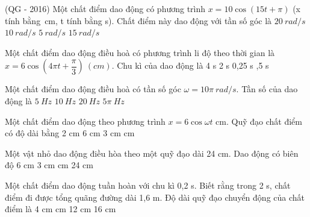 \setcounter{ex}{0}
\setcounter{paragraph}{0}
\PhanI

\begin{ex} %
(QG - 2016) Một chất điểm dao động có phương trình $x=10\cos\left(15t+\pi\right)$ (x tính bằng\ cm, t tính bằng s). Chất điểm này dao động với tần số góc là
\choice
{$20\ rad/s$}
{$10\ rad/s$}
{$5\ rad/s$}
{\True $15\ rad/s$}
\end{ex} 
\begin{ex}
Một chất điểm dao động điều hoà có phương trình li độ theo thời gian là $x=6\cos(4\pi t+\dfrac{\pi}{3})\ (cm)$. Chu kì của dao động là
\choice
{4 s}
{2 s}
{0,25 s}
{,5 s}
\end{ex} 
\begin{ex}
Một chất điểm dao động điều hoà có tần số góc $\omega=10\pi\ rad/s$. Tần số của dao động là
\choice
{\True $5\ Hz$}
{$10\ Hz$}
{$20\ Hz$}
{$5\pi\ Hz$}
\end{ex} 
\begin{ex}%
Một chất điểm dao động theo phương trình $x = 6\cos\omega t$ cm. Quỹ đạo chất điểm có độ dài bằng
\choice
{2 cm}
{6 cm}
{3 cm}
{ cm}
\end{ex} 

\begin{ex}%
Một vật nhỏ dao động điều hòa theo một quỹ đạo dài 24 cm. Dao động có biên độ
\choice
{6 cm}
{3 cm}
{ cm}
{24 cm}
\end{ex} 

 
\begin{ex} %
Một chất điểm dao động tuần hoàn với chu kì 0,2 s. Biết rằng trong 2 s, chất điểm đi được tổng quãng đường dài 1,6 m. Độ dài quỹ đạo chuyển động của chất điểm là
\choice
{4 cm}
{ cm}
{12 cm}
{16 cm}
\end{ex} 

